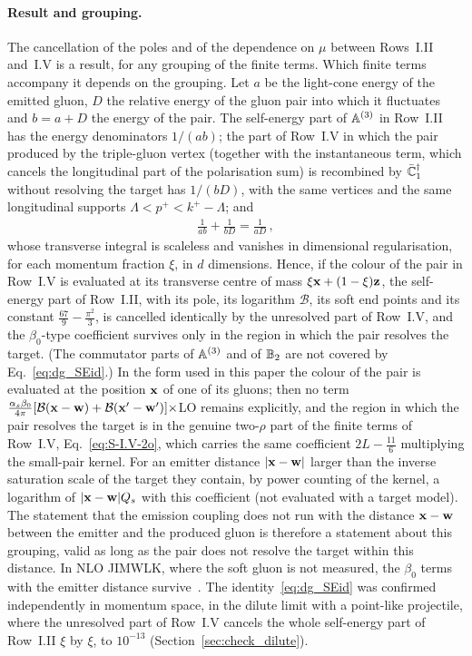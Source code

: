 \paragraph{Result and grouping.} The cancellation of the poles and of the dependence on $\mu$ between Rows~I.II and~I.V is a result, for any grouping of the finite terms. Which finite terms accompany it depends on the grouping. Let $a$ be the light-cone energy of the emitted gluon, $D$ the relative energy of the gluon pair into which it fluctuates and $b=a+D$ the energy of the pair. The self-energy part of $\mathbb{A}^{(3)}$ in Row~I.II has the energy denominators $1/(ab)$; the part of Row~I.V in which the pair produced by the triple-gluon vertex (together with the instantaneous term, which cancels the longitudinal part of the polarisation sum) is recombined by $\bar{\mathbb{C}}_1^\dagger$ without resolving the target has $1/(bD)$, with the same vertices and the same longitudinal supports $\Lambda<p^+<k^+-\Lambda$; and
\begin{align}\label{eq:dg_SEid}
\frac{1}{ab}+\frac{1}{bD}=\frac{1}{aD}\,,
\end{align}
whose transverse integral is scaleless and vanishes in dimensional regularisation, for each momentum fraction $\xi$, in $d$ dimensions. Hence, if the colour of the pair in Row~I.V is evaluated at its transverse centre of mass $\xi\mathbf{x}+(1-\xi)\mathbf{z}$, the self-energy part of Row~I.II, with its pole, its logarithm $\mathcal B$, its soft end points and its constant $\frac{67}{9}-\frac{\pi^2}{3}$, is cancelled identically by the unresolved part of Row~I.V, and the $\beta_0$-type coefficient survives only in the region in which the pair resolves the target. (The commutator parts of $\mathbb{A}^{(3)}$ and of $\mathbb{B}_2$ are not covered by Eq.~\eqref{eq:dg_SEid}.) In the form used in this paper the colour of the pair is evaluated at the position $\mathbf{x}$ of one of its gluons; then no term $\frac{\alpha_s\beta_0}{4\pi}[\mathcal B(\mathbf{x}-\mathbf{w})+\mathcal B(\mathbf{x}'-\mathbf{w}')]\times$LO remains explicitly, and the region in which the pair resolves the target is in the genuine two-$\rho$ part of the finite terms of Row~I.V, Eq.~\eqref{eq:S-I.V-2o}, which carries the same coefficient $2L-\frac{11}{6}$ multiplying the small-pair kernel. For an emitter distance $|\mathbf{x}-\mathbf{w}|$ larger than the inverse saturation scale of the target they contain, by power counting of the kernel, a logarithm of $|\mathbf{x}-\mathbf{w}|Q_s$ with this coefficient (not evaluated with a target model). The statement that the emission coupling does not run with the distance $\mathbf{x}-\mathbf{w}$ between the emitter and the produced gluon is therefore a statement about this grouping, valid as long as the pair does not resolve the target within this distance. In NLO JIMWLK, where the soft gluon is not measured, the $\beta_0$ terms with the emitter distance survive~\cite{Kovner:2023vsy}. The identity~\eqref{eq:dg_SEid} was confirmed independently in momentum space, in the dilute limit with a point-like projectile, where the unresolved part of Row~I.V cancels the whole self-energy part of Row~I.II $\xi$ by $\xi$, to $10^{-13}$ (Section~\ref{sec:check_dilute}).

